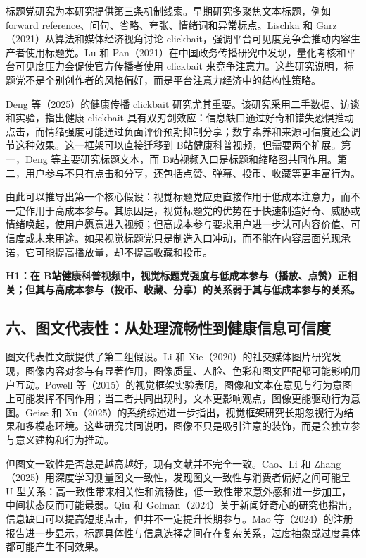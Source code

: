\documentclass[
  12pt,
]{article}
\begin{document}
标题党研究为本研究提供第三条机制线索。早期研究多聚焦文本标题，例如
forward reference、问句、省略、夸张、情绪词和异常标点。Lischka 和
Garz（2021）从算法和媒体经济视角讨论
clickbait，强调平台可见度竞争会推动内容生产者使用标题党。Lu 和
Pan（2021）在中国政务传播研究中发现，量化考核和平台可见度压力会促使官方传播者使用
clickbait
来竞争注意力。这些研究说明，标题党不是个别创作者的风格偏好，而是平台注意力经济中的结构性策略。

Deng 等（2025）的健康传播 clickbait
研究尤其重要。该研究采用二手数据、访谈和实验，指出健康 clickbait
具有双刃剑效应：信息缺口通过好奇和错失恐惧推动点击，而情绪强度可能通过负面评价预期抑制分享；数字素养和来源可信度还会调节这种效果。这一框架可以直接迁移到
B站健康科普视频，但需要两个扩展。第一，Deng 等主要研究标题文本，而
B站视频入口是标题和缩略图共同作用。第二，用户参与不只有点击和分享，还包括点赞、弹幕、投币、收藏等更丰富行为。

由此可以推导出第一个核心假设：视觉标题党应更直接作用于低成本注意力，而不一定作用于高成本参与。其原因是，视觉标题党的优势在于快速制造好奇、威胁或情绪唤起，使用户愿意进入视频；但高成本参与要求用户进一步认可内容价值、可信度或未来用途。如果视觉标题党只是制造入口冲动，而不能在内容层面兑现承诺，它可能提高播放量，却不提高收藏和投币。

\textbf{H1：在
B站健康科普视频中，视觉标题党强度与低成本参与（播放、点赞）正相关；但其与高成本参与（投币、收藏、分享）的关系弱于其与低成本参与的关系。}

\subsection{六、图文代表性：从处理流畅性到健康信息可信度}\label{ux516dux56feux6587ux4ee3ux8868ux6027ux4eceux5904ux7406ux6d41ux7545ux6027ux5230ux5065ux5eb7ux4fe1ux606fux53efux4fe1ux5ea6}

图文代表性文献提供了第二组假设。Li 和
Xie（2020）的社交媒体图片研究发现，图像内容对参与有显著作用，图像质量、人脸、色彩和图文匹配都可能影响用户互动。Powell
等（2015）的视觉框架实验表明，图像和文本在意见与行为意图上可能发挥不同作用；当二者共同出现时，文本更影响观点，图像更能驱动行为意图。Geise
和
Xu（2025）的系统综述进一步指出，视觉框架研究长期忽视行为结果和多模态环境。这些研究共同说明，图像不只是吸引注意的装饰，而是会独立参与意义建构和行为推动。

但图文一致性是否总是越高越好，现有文献并不完全一致。Cao、Li 和
Zhang（2025）用深度学习测量图文一致性，发现图文一致性与消费者偏好之间可能呈
U
型关系：高一致性带来相关性和流畅性，低一致性带来意外感和进一步加工，中间状态反而可能最弱。Qiu
和
Golman（2024）关于新闻好奇心的研究也指出，信息缺口可以提高短期点击，但并不一定提升长期参与。Mao
等（2024）的注册报告进一步显示，标题具体性与信息选择之间存在复杂关系，过度抽象或过度具体都可能产生不同效果。
\end{document}
